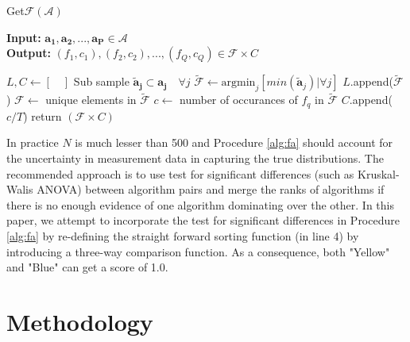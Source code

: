 \documentclass[conference]{IEEEtran}
\begin{document}
\begin{algorithm}
	\caption{ Get$\mathcal{F}$$(\mathcal{A})$ }
	\label{alg:fa}
	\hspace*{\algorithmicindent} \textbf{Input: } $ \mathbf{a_1},\mathbf{a_2} ,..., \mathbf{a_P}\in \mathcal{A}$ \\
	\hspace*{\algorithmicindent} \textbf{Output: } $ (f_1,c_1), (f_2, c_2), ..., (f_Q,c_Q) \in \mathcal{F} \times C  $
	\begin{algorithmic}[1] 
		\State $L, C \leftarrow [ \quad ]$ 
		\State Sub sample $\mathbf{\tilde{a}_{j}} \subset \mathbf{a_j} \quad \forall j$  
		\State $\tilde{\mathcal{F}} \leftarrow \text{argmin}_j[min(\mathbf{\tilde{a}}_j  ) | \forall j]$ 
		\State $L$.append($\tilde{\mathcal{F}}$)
		\EndFor
		\State $\mathcal{F} \leftarrow $ unique elements in $\tilde{\mathcal{F}}$ 
		\State $c \leftarrow$ number of occurances of $f_q$ in $\tilde{\mathcal{F}}$ 
		\State $C$.append($c/T$)
		\EndFor
		\State return $(\mathcal{F} \times C)$
	\end{algorithmic}
\end{algorithm}

In practice $N$ is much lesser than 500 and Procedure \ref{alg:fa} should account for the uncertainty in measurement data in capturing the true distributions. 
The recommended approach is to use test for significant differences (such as Kruskal-Walis ANOVA\cite{hoefler2015scientific}) between algorithm pairs and merge the ranks of algorithms if there is no enough evidence of one algorithm dominating over the other. In this paper, we attempt to incorporate the test for significant differences in Procedure \ref{alg:fa} by re-defining the straight forward sorting function (in line 4) by introducing a three-way comparison function. As a consequence, both "Yellow" and "Blue" can get a score of 1.0.

\section{Methodology}
\label{sec:met}
\end{document}
